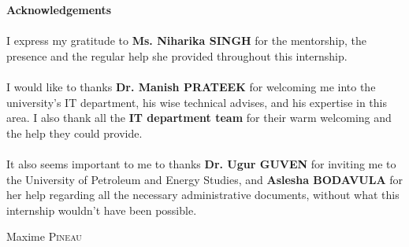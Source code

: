 


\begin{center}
	\LARGE{\textbf{Acknowledgements}}\\[1cm]
\end{center}


\large{ \paragraph{} 
I express my gratitude to \textbf{Ms. Niharika SINGH} for the mentorship, the  presence and the regular help she provided throughout this internship.
}


\large{ \paragraph{} 
I would like to thanks \textbf{Dr. Manish PRATEEK} for welcoming me into the university's IT department, his wise technical advises, and his expertise in this area. I also thank all the \textbf{IT department team} for their warm welcoming and the help they could provide. 
}


\large{ \paragraph{} 
It also seems important to me to thanks \textbf{Dr. Ugur GUVEN} for inviting me to the University of Petroleum and Energy Studies, and \textbf{Aslesha BODAVULA} for her help regarding all the necessary administrative documents, without what this internship wouldn't have been possible.  
}



\begin{flushright} 
	Maxime \textsc{Pineau}\\
\end{flushright}


\newpage
